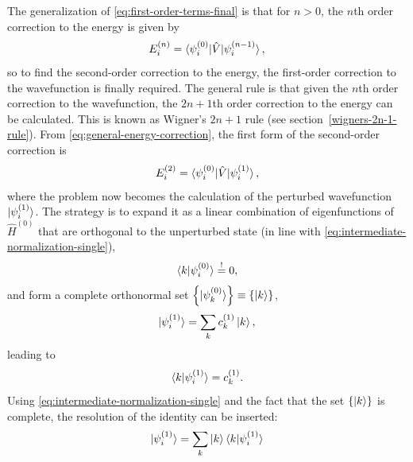 \documentclass[%
class = book,%
crop = false,%
float = true,%
multi = true,%
preview = false,%
]{standalone}
\begin{document}
The generalization of \eqref{eq:first-order-terms-final} is that for \(n > 0\), the \(n\)th order correction to the energy is given by
\begin{equation}
  \label{eq:general-energy-correction}
  E_{i}^{(n)} = \braket{\psi_{i}^{(0)}|\hat{V}|\psi_{i}^{(n-1)}},
\end{equation}
so to find the second-order correction to the energy, the first-order correction to the wavefunction is finally required. The general rule is that given the \(n\)th order correction to the wavefunction, the \(2n+1\)th order correction to the energy can be calculated. This is known as Wigner's \(2n+1\) rule (see section~\ref{wigners-2n-1-rule}). From \eqref{eq:general-energy-correction}, the first form of the second-order correction is
\begin{equation}
  \label{eq:second-order-correction-first-form}
  E_{i}^{(2)} = \braket{\psi_{i}^{(0)}|\hat{V}|\psi_{i}^{(1)}},
\end{equation}
where the problem now becomes the calculation of the perturbed wavefunction \(\ket{\psi_{i}^{(1)}}\). The strategy is to expand it as a linear combination of eigenfunctions of \(\hat{H}^{(0)}\) that are orthogonal to the unperturbed state (in line with \eqref{eq:intermediate-normalization-single}),
\begin{equation}
  \label{eq:orthogonal-to-reference-state}
  \braket{k|\psi_{i}^{(0)}} \overset{!}{=} 0,
\end{equation}
and form a complete orthonormal set \(\left\{\ket{\psi_{k}^{(0)}}\right\} \equiv \left\{\ket{k}\right\}\),
\begin{equation}
  \label{eq:orthonormal-eigenfunction-expansion}
  \ket{\psi_{i}^{(1)}} = \sum_{k} c_{k}^{(1)} \ket{k},
\end{equation}
leading to
\begin{equation}
  \label{eq:coefficient-selection}
  \braket{k|\psi_{i}^{(1)}} = c_{k}^{(1)}.
\end{equation}
Using \eqref{eq:intermediate-normalization-single} and the fact that the set \(\{\ket{k}\}\) is complete, the resolution of the identity can be inserted:
\begin{equation}
  \label{eq:resolution-of-the-identity}
  \ket{\psi_{i}^{(1)}} = \sum_{k} \ket{k} \braket{k|\psi_{i}^{(1)}}
\end{equation}
\end{document}
